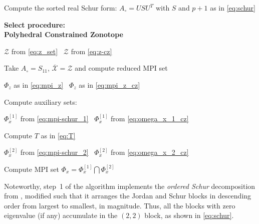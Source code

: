 \documentclass[journal,twoside,web]{ieeecolor}
\begin{document}
\begin{algorithm}[!ht]

\label{step:1}Compute the sorted real Schur form: $A_{\circ} = USU^T$ with $S$ and $p+1$ as in \eqref{eq:schur}
\BlankLine


\textbf{Select procedure:\\ 
\hphantom{poly}
Polyhedral \hspace{2.56em} \vrule  \hspace{3em} Constrained Zonotope}
\BlankLine

$\mathcal{Z}$ from \eqref{eq:z_set} \; \hspace{4.25em} \vrule  \hspace{3.25em} $\,$ 
$\mathcal{Z}$ from \eqref{eq:z-cz}
\BlankLine

Take $A_\circ = S_{11}$, $\overline{\mathcal{X}}=\mathcal{Z}$ and compute reduced MPI set
\BlankLine

\hspace{3.77em}$\Phi_z$ as in \eqref{eq:mpi_z}\; \hspace{4.25em} \vrule   \hspace{3.5em} $\,$ $\Phi_z$ as in \eqref{eq:mpi_z_cz}
\BlankLine

Compute auxiliary sets:
\BlankLine

\hspace{3.5em} $\Phi_{x}^{[1]}$ from \eqref{eq:mpi-schur_1} \; \hspace{3.5em} \vrule   \hspace{3.5em} $\,$ 
$\Phi_{x}^{[1]}$ from \eqref{eq:omega_x_1_cz}
\BlankLine

\hspace{3.5em} Compute $T$ as in \eqref{eq:T}
\BlankLine

\hspace{3.5em} $\Phi_{x}^{[2]}$ from \eqref{eq:mpi-schur_2} \; \hspace{3.5em} \vrule   \hspace{3.5em} $\,$ 
$\Phi_{x}^{[2]}$ from \eqref{eq:omega_x_2_cz}
\BlankLine

Compute MPI set $\Phi_{x} = \Phi_{x}^{[1]} \bigcap \Phi_{x}^{[2]}$
\caption{MPI set for singular cases }
\label{alg:MPI_poles_in_zero}
\end{algorithm}
Noteworthy, step~1 of the algorithm implements the \emph{ordered Schur} decomposition from \cite{brandts2002matlab}, modified such that it arranges the Jordan and Schur blocks in descending order from largest to smallest, in magnitude. Thus, all the blocks with zero eigenvalue (if any) accumulate in the $(2,2)$ block, as shown in \eqref{eq:schur}.
\end{document}
